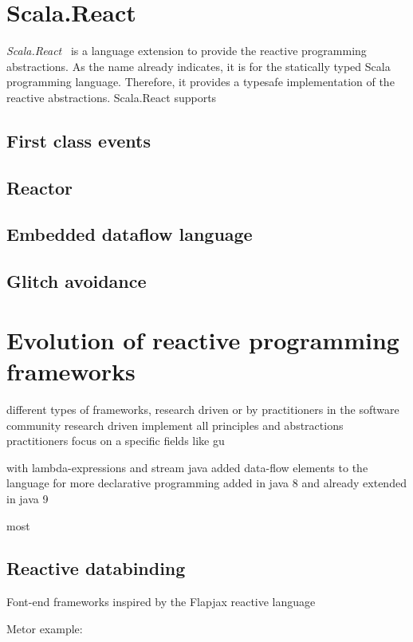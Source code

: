 \documentclass[acmsmall]{acmart}\settopmatter{printfolios=true,printccs=false,printacmref=false}
\begin{document}
\section{Scala.React}
	\textit{Scala.React}~\cite{Maier:2012} is a language extension to provide the reactive programming abstractions.
	As the name already indicates, it is for the statically typed Scala programming language. 
	Therefore, it provides a typesafe implementation of the reactive abstractions. 
	Scala.React supports 
	\subsection{First class events}

	\subsection{Reactor}

	\subsection{Embedded dataflow language}

	\subsection{Glitch avoidance}

\section{Evolution of reactive programming frameworks}
	
	different types of frameworks, research driven or by practitioners in the software community
	research driven implement all principles and abstractions
	practitioners focus on a specific fields like gu

	with lambda-expressions and stream java added data-flow elements to the language for more declarative programming
	added in java 8 and already extended in java 9

	most 

	\subsection{Reactive databinding}

		Font-end frameworks inspired by the Flapjax reactive language~\cite{Meyerovich:2009}

		Metor example: ~\cite{hochhaus2016meteor}
\end{document}
